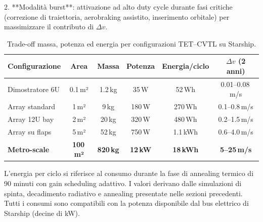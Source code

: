 \documentclass[11pt,a4paper]{article}
\theoremstyle{plain}
\theoremstyle{definition}
\begin{document}
\vspace{0.5cm}
2. **Modalità burst**: attivazione ad alto duty cycle durante fasi critiche (correzione di traiettoria, aerobraking assistito, inserimento orbitale) per massimizzare il contributo di $\Delta v$.







\vspace{0.3cm}



\begin{table}[H]
\centering
\small
\renewcommand{\arraystretch}{1.25}

\begin{tabular}{l@{\quad}ccccc}
\toprule
\rowcolor{teal!15}
\textbf{Configurazione} & \textbf{Area} & \textbf{Massa} & \textbf{Potenza} & \textbf{Energia/ciclo} & \textbf{$\Delta v$ (2 anni)} \\
\midrule
Dimostratore 6U         & 0.1\,m² & 1.2\,kg & 35\,W   & 52\,Wh   & 0.01--0.08\,m/s \\
Array standard          & 1\,m²   & 9\,kg   & 180\,W  & 270\,Wh  & 0.1--0.8\,m/s \\
Array 12U bay           & 2\,m²   & 20\,kg  & 320\,W  & 480\,Wh  & 0.2--1.5\,m/s \\
Array su flaps          & 5\,m²   & 52\,kg  & 750\,W  & 1.1\,kWh & 0.6--4.0\,m/s \\
\rowcolor{emerald!15}
\textbf{Metro-scale}    & \textbf{100\,m²} & \textbf{820\,kg} & \textbf{12\,kW} & \textbf{18\,kWh} & \textbf{5--25\,m/s} \\
\bottomrule
\end{tabular}

\vspace{8pt}

\vspace{0.3cm}

{\small L'energia per ciclo si riferisce al consumo durante la fase di annealing termico di 90 minuti con gain scheduling adattivo. 
I valori derivano dalle simulazioni di spinta, decadimento radiativo e annealing presentate nelle sezioni precedenti. 
Tutti i consumi sono compatibili con la potenza disponibile dal bus elettrico di Starship (decine di kW).}

\caption{Trade-off massa, potenza ed energia per configurazioni TET--CVTL su Starship.}
\label{tab:starship_detailed_tradeoff}
\end{table}
\end{document}
